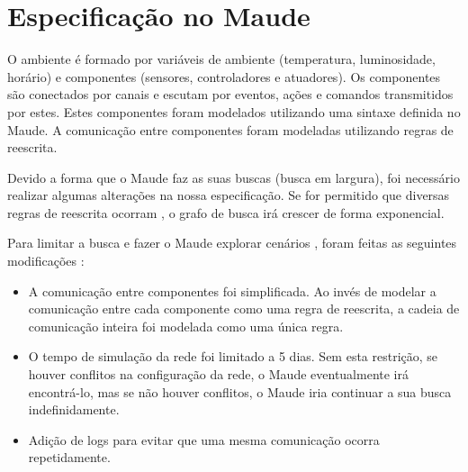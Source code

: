 \section{Especificação no Maude} \label{sec:chap5}

O ambiente é formado por variáveis de ambiente (temperatura, luminosidade, horário) e componentes (sensores, controladores e atuadores). Os componentes são conectados por canais e escutam por eventos, ações e comandos transmitidos por estes. Estes componentes foram modelados utilizando uma sintaxe definida no Maude. A comunicação entre componentes foram modeladas utilizando regras de reescrita.

Devido a forma que o Maude faz as suas buscas (busca em largura), foi necessário realizar algumas alterações na nossa especificação. Se for permitido que diversas regras de reescrita ocorram , o grafo de busca irá crescer de forma exponencial.

Para limitar a busca e fazer o Maude explorar cenários , foram feitas as seguintes modificações :

\begin{itemize}
  \item A comunicação entre componentes foi simplificada. Ao invés de modelar a comunicação entre cada componente como uma regra de reescrita, a cadeia de comunicação inteira foi modelada como uma única regra.
  \item O tempo de simulação da rede foi limitado a 5 dias. Sem esta restrição, se houver conflitos na configuração da rede, o Maude eventualmente irá encontrá-lo, mas se não houver conflitos, o Maude iria continuar a sua busca indefinidamente.
  \item Adição de logs para evitar que uma mesma comunicação ocorra repetidamente.
\end{itemize}

